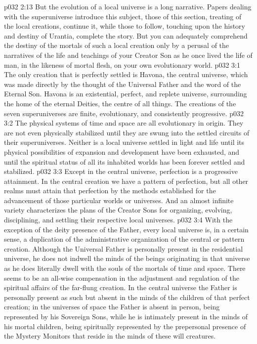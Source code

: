 \vs p032 2:13 \pc But the evolution of a local universe is a long narrative. Papers dealing with the superuniverse introduce this subject, those of this section, treating of the local creations, continue it, while those to follow, touching upon the history and destiny of Urantia, complete the story. But you can adequately comprehend the destiny of the mortals of such a local creation only by a perusal of the narratives of the life and teachings of your Creator Son as he once lived the life of man, in the likeness of mortal flesh, on your own evolutionary world.
\vs p032 3:1 The only creation that is perfectly settled is Havona, the central universe, which was made directly by the thought of the Universal Father and the word of the Eternal Son. Havona is an existential, perfect, and replete universe, surrounding the home of the eternal Deities, the centre of all things. The creations of the seven superuniverses are finite, evolutionary, and consistently progressive.
\vs p032 3:2 The physical systems of time and space are all evolutionary in origin. They are not even physically stabilized until they are swung into the settled circuits of their superuniverses. Neither is a local universe settled in light and life until its physical possibilities of expansion and development have been exhausted, and until the spiritual status of all its inhabited worlds has been forever settled and stabilized.
\vs p032 3:3 Except in the central universe, perfection is a progressive attainment. In the central creation we have a pattern of perfection, but all other realms must attain that perfection by the methods established for the advancement of those particular worlds or universes. And an almost infinite variety characterizes the plans of the Creator Sons for organizing, evolving, disciplining, and settling their respective local universes.
\vs p032 3:4 \pc With the exception of the deity presence of the Father, every local universe is, in a certain sense, a duplication of the administrative organization of the central or pattern creation. Although the Universal Father is personally present in the residential universe, he does not indwell the minds of the beings originating in that universe as he does literally dwell with the souls of the mortals of time and space. There seems to be an all\hyp{}wise compensation in the adjustment and regulation of the spiritual affairs of the far\hyp{}flung creation. In the central universe the Father is personally present as such but absent in the minds of the children of that perfect creation; in the universes of space the Father is absent in person, being represented by his Sovereign Sons, while he is intimately present in the minds of his mortal children, being spiritually represented by the prepersonal presence of the Mystery Monitors that reside in the minds of these will creatures.
